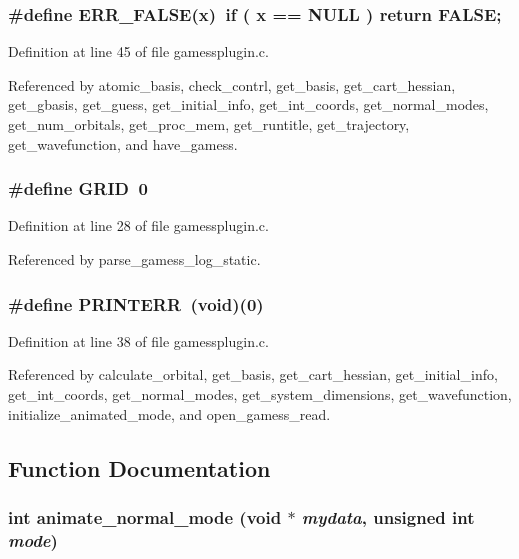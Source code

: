 \subsubsection{\setlength{\rightskip}{0pt plus 5cm}\#define ERR\_\-FALSE(x)\ if ( x == NULL ) return FALSE;}\label{gamessplugin_8c_a2}




Definition at line 45 of file gamessplugin.c.

Referenced by atomic\_\-basis, check\_\-contrl, get\_\-basis, get\_\-cart\_\-hessian, get\_\-gbasis, get\_\-guess, get\_\-initial\_\-info, get\_\-int\_\-coords, get\_\-normal\_\-modes, get\_\-num\_\-orbitals, get\_\-proc\_\-mem, get\_\-runtitle, get\_\-trajectory, get\_\-wavefunction, and have\_\-gamess.
\subsubsection{\setlength{\rightskip}{0pt plus 5cm}\#define GRID\ 0}\label{gamessplugin_8c_a0}




Definition at line 28 of file gamessplugin.c.

Referenced by parse\_\-gamess\_\-log\_\-static.
\subsubsection{\setlength{\rightskip}{0pt plus 5cm}\#define PRINTERR\ (void)(0)}\label{gamessplugin_8c_a1}




Definition at line 38 of file gamessplugin.c.

Referenced by calculate\_\-orbital, get\_\-basis, get\_\-cart\_\-hessian, get\_\-initial\_\-info, get\_\-int\_\-coords, get\_\-normal\_\-modes, get\_\-system\_\-dimensions, get\_\-wavefunction, initialize\_\-animated\_\-mode, and open\_\-gamess\_\-read.

\subsection{Function Documentation}
\subsubsection{\setlength{\rightskip}{0pt plus 5cm}int animate\_\-normal\_\-mode (void $\ast$ {\em mydata}, unsigned int {\em mode})}\label{gamessplugin_8c_a17}




